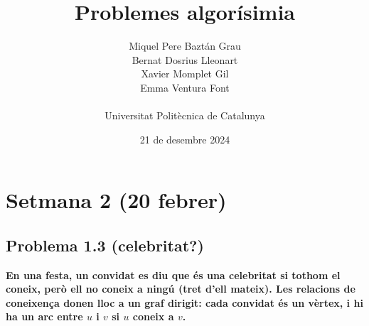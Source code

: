 \documentclass[a4paper,12pt]{article}
\title{Problemes algorísimia}
\author{Miquel Pere Baztán Grau
    \\ Bernat Dosrius Lleonart
    \\ Xavier Momplet Gil
    \\ Emma Ventura Font 
    \\ \\   Universitat Politècnica de Catalunya}
\date{21 de desembre 2024}
\begin{document}
\maketitle

\section*{Setmana 2 (20 febrer)}

\subsection*{Problema 1.3 (celebritat?)}
\textbf{En una festa, un convidat es diu que és una celebritat si tothom el coneix, però ell no coneix a ningú (tret d'ell mateix). Les relacions de coneixença donen lloc a un graf dirigit: cada convidat és un vèrtex, i hi ha un arc entre $u$ i $v$ si $u$ coneix a $v$.}
\end{document}
